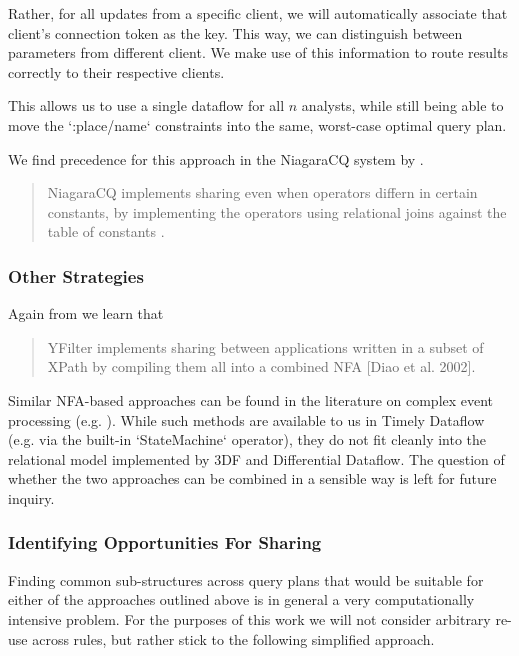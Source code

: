 \documentclass[../catalog.tex]{subfiles}
\begin{document}
Rather, for all updates from a specific client, we will automatically
associate that client's connection token as the key. This way, we can
distinguish between parameters from different client. We make use of
this information to route results correctly to their respective
clients.

This allows us to use a single dataflow for all $n$ analysts, while
still being able to move the `:place/name` constraints into the same,
worst-case optimal query plan.

We find precedence for this approach in the NiagaraCQ system by
\cite{chen2000niagaracq}.

\begin{quote}
NiagaraCQ implements sharing even when operators differn in certain
constants, by implementing the operators using relational joins
against the table of constants \cite{chen2000niagaracq}.

\cite{hirzel2014catalog}
\end{quote}

\subsubsection{Other Strategies}

Again from \cite{hirzel2014catalog} we learn that

\begin{quote}
YFilter implements sharing between applications written in a subset of
XPath by compiling them all into a combined NFA [Diao et al. 2002].
\end{quote}

Similar NFA-based approaches can be found in the literature on complex
event processing (e.g. \cite{agrawal2008}). While such methods are
available to us in Timely Dataflow (e.g. via the built-in
`StateMachine` operator), they do not fit cleanly into the relational
model implemented by 3DF and Differential Dataflow. The question of
whether the two approaches can be combined in a sensible way is left
for future inquiry.

\subsubsection{Identifying Opportunities For Sharing}

Finding common sub-structures across query plans that would be
suitable for either of the approaches outlined above is in general a
very computationally intensive problem. For the purposes of this work
we will not consider arbitrary re-use across rules, but rather stick
to the following simplified approach.
\end{document}
